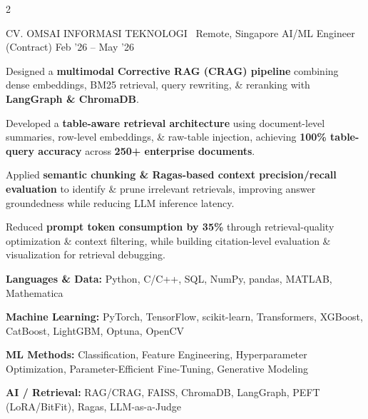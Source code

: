 \documentclass{resume}
\begin{document}
\begin{paracol}{2}
{\begin{resumeItemize}
\end{resumeItemize}
}

\resumeExperience
{CV. OMSAI INFORMASI TEKNOLOGI \hfill {\normalfont\small\faMapMarker*\ Remote, Singapore}}
{\textcolor{subheadingblue}{AI/ML Engineer (Contract)}}
{Feb '26 -- May '26}
{
\begin{resumeItemize}

\item Designed a
\textbf{multimodal Corrective RAG (CRAG) pipeline}
combining dense embeddings, BM25 retrieval, query rewriting,
\& reranking with \textbf{LangGraph \& ChromaDB}.

\item Developed a
\textbf{table-aware retrieval architecture}
using document-level summaries, row-level embeddings,
\& raw-table injection, achieving
\textbf{100\% table-query accuracy}
across \textbf{250+ enterprise documents}.

\item Applied
\textbf{semantic chunking \& Ragas-based context precision/recall evaluation}
to identify \& prune irrelevant retrievals, improving
answer groundedness while reducing LLM inference latency.

\item Reduced
\textbf{prompt token consumption by 35\%}
through retrieval-quality optimization \& context filtering,
while building citation-level evaluation \& visualization
for retrieval debugging.

\end{resumeItemize}
}


\begin{resumeItemize}

\item \textbf{Languages \& Data:}
Python, C/C++, SQL, NumPy, pandas, MATLAB, Mathematica

\item \textbf{Machine Learning:}
PyTorch, TensorFlow, scikit-learn, Transformers,
XGBoost, CatBoost, LightGBM, Optuna, OpenCV

\item \textbf{ML Methods:}
Classification, Feature Engineering, Hyperparameter Optimization,
Parameter-Efficient Fine-Tuning, Generative Modeling

\item \textbf{AI / Retrieval:}
RAG/CRAG, FAISS, ChromaDB, LangGraph,
PEFT (LoRA/BitFit), Ragas, LLM-as-a-Judge


\end{resumeItemize}
\end{paracol}
\end{document}
